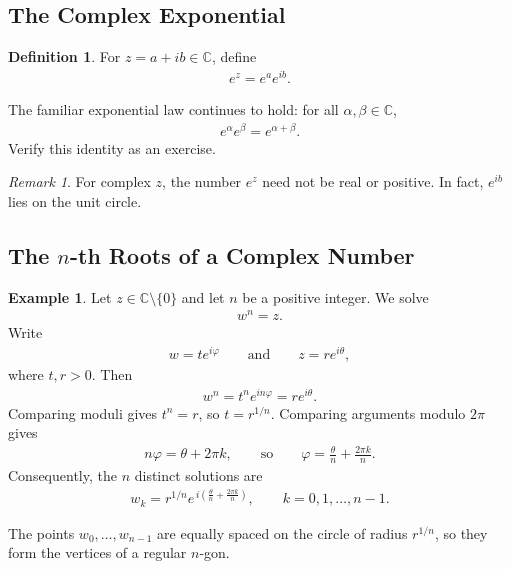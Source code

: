 \documentclass[11pt]{article}
\theoremstyle{plain}
\theoremstyle{definition}
\newtheorem{definition}[theorem]{Definition}
\newtheorem{example}[theorem]{Example}
\theoremstyle{remark}
\newtheorem*{remark}{Remark}
\numberwithin{equation}{section}
\newcommand{\be}{\begin{eqnarray}}
\newcommand{\ee}{\end{eqnarray}}
\newcommand{\C}{\mathbb{C}}
\begin{document}
\subsection*{The Complex Exponential}

\begin{definition}
For $z=a+ib\in\C$, define
\be
  e^z=e^a e^{ib}.
\ee
\end{definition}

The familiar exponential law continues to hold: for all
$\alpha,\beta\in\C$,
\be
  e^\alpha e^\beta=e^{\alpha+\beta}.
\ee
Verify this identity as an exercise.

\begin{remark}
For complex $z$, the number $e^z$ need not be real or positive.  In fact,
$e^{ib}$ lies on the unit circle.
\end{remark}

\subsection*{The \texorpdfstring{$n$}{n}-th Roots of a Complex Number}

\begin{example}
Let $z\in\C\setminus\{0\}$ and let $n$ be a positive integer.  We solve
\be
  w^n=z.
\ee
Write
\be
  w=te^{i\varphi}
  \qquad\text{and}\qquad
  z=re^{i\theta},
\ee
where $t,r>0$.  Then
\be
  w^n=t^n e^{in\varphi}=re^{i\theta}.
\ee
Comparing moduli gives $t^n=r$, so $t=r^{1/n}$.  Comparing arguments modulo
$2\pi$ gives
\be
  n\varphi=\theta+2\pi k,
  \qquad\text{so}\qquad
  \varphi=\frac{\theta}{n}+\frac{2\pi k}{n}.
\ee
Consequently, the $n$ distinct solutions are
\be
  \boxed{
    w_k=r^{1/n}
    e^{\,i\left(\frac{\theta}{n}+\frac{2\pi k}{n}\right)}
  },
  \qquad k=0,1,\ldots,n-1.
\ee
\end{example}

The points $w_0,\ldots,w_{n-1}$ are equally spaced on the circle of radius
$r^{1/n}$, so they form the vertices of a regular $n$-gon.

\begin{center}
\end{center}
\end{document}
